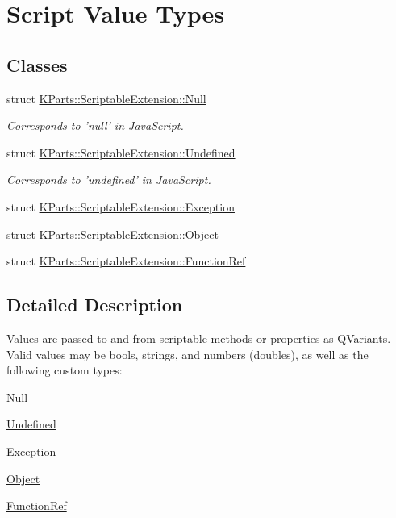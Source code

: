\hypertarget{group__ScriptValueTypes}{\section{Script Value Types}
\label{group__ScriptValueTypes}
}
\subsection*{Classes}
\begin{DoxyCompactItemize}
\item 
struct \hyperlink{structKParts_1_1ScriptableExtension_1_1Null}{K\+Parts\+::\+Scriptable\+Extension\+::\+Null}
\begin{DoxyCompactList}\small\item\em Corresponds to 'null' in Java\+Script. \end{DoxyCompactList}\item 
struct \hyperlink{structKParts_1_1ScriptableExtension_1_1Undefined}{K\+Parts\+::\+Scriptable\+Extension\+::\+Undefined}
\begin{DoxyCompactList}\small\item\em Corresponds to 'undefined' in Java\+Script. \end{DoxyCompactList}\item 
struct \hyperlink{structKParts_1_1ScriptableExtension_1_1Exception}{K\+Parts\+::\+Scriptable\+Extension\+::\+Exception}
\item 
struct \hyperlink{structKParts_1_1ScriptableExtension_1_1Object}{K\+Parts\+::\+Scriptable\+Extension\+::\+Object}
\item 
struct \hyperlink{structKParts_1_1ScriptableExtension_1_1FunctionRef}{K\+Parts\+::\+Scriptable\+Extension\+::\+Function\+Ref}
\end{DoxyCompactItemize}


\subsection{Detailed Description}
Values are passed to and from scriptable methods or properties as Q\+Variants. Valid values may be bools, strings, and numbers (doubles), as well as the following custom types\+: \begin{DoxyItemize}
\item \hyperlink{structKParts_1_1ScriptableExtension_1_1Null}{Null} \item \hyperlink{structKParts_1_1ScriptableExtension_1_1Undefined}{Undefined} \item \hyperlink{structKParts_1_1ScriptableExtension_1_1Exception}{Exception} \item \hyperlink{structKParts_1_1ScriptableExtension_1_1Object}{Object} \item \hyperlink{structKParts_1_1ScriptableExtension_1_1FunctionRef}{Function\+Ref} \end{DoxyItemize}
